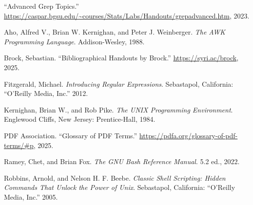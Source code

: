 \documentclass[
  letterpaper,
]{tufte-handout}
\newlength{\cslhangindent}
\newenvironment{CSLReferences}[2] %
 {\begin{list}{}{%
  \setlength{\itemindent}{0pt}
  \setlength{\leftmargin}{0pt}
  \setlength{\parsep}{0pt}
  \ifodd #1
   \setlength{\leftmargin}{\cslhangindent}
   \setlength{\itemindent}{-1\cslhangindent}
  \fi
  \setlength{\itemsep}{#2\baselineskip}}}
 {\end{list}}
\begin{document}
\label{refs}
\begin{CSLReferences}{1}{0}
{``Advanced Grep Topics.''}
\url{https://caspar.bgsu.edu/~courses/Stats/Labs/Handouts/grepadvanced.htm},
2023.

Aho, Alfred V., Brian W. Kernighan, and Peter J. Weinberger. \emph{The
AWK Programming Language}. Addison-Wesley, 1988.

Brock, Sebastian. {``Bibliographical Handouts by Brock.''}
\url{https://syri.ac/brock}, 2025.

Fitzgerald, Michael. \emph{Introducing Regular Expressions}. Sebastapol,
California: {``O'Reilly Media, Inc.''} 2012.

Kernighan, Brian W., and Rob Pike. \emph{The UNIX Programming
Environment}. Englewood Cliffs, New Jersey: Prentice-Hall, 1984.

PDF Association. {``Glossary of PDF Terms.''}
\url{https://pdfa.org/glossary-of-pdf-terms/\#p}, 2025.

Ramey, Chet, and Brian Fox. \emph{The GNU Bash Reference Manual}. 5.2
ed., 2022.

Robbins, Arnold, and Nelson H. F. Beebe. \emph{Classic Shell Scripting:
Hidden Commands That Unlock the Power of Unix}. Sebastapol, California:
{``O'Reilly Media, Inc.''} 2005.

\end{CSLReferences}
\end{document}
